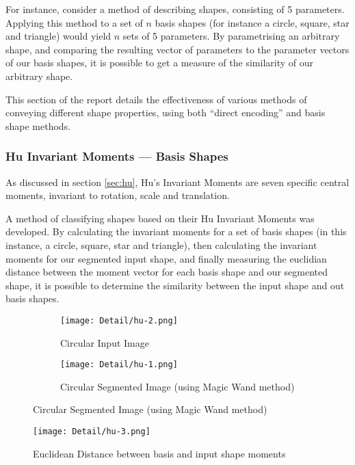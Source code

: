 For instance, consider a method of describing shapes, consisting of 5 parameters. Applying this method to a set of $n$ basis shapes (for instance a circle, square, star and triangle) would yield $n$ sets of 5 parameters. By parametrising an arbitrary shape, and comparing the resulting vector of parameters to the parameter vectors of our basis shapes, it is possible to get a measure of the similarity of our arbitrary shape.

This section of the report details the effectiveness of various methods of conveying different shape properties, using both ``direct encoding'' and basis shape methods.

\subsubsection{Hu Invariant Moments --- Basis Shapes}
\label{sec:hubs}
As discussed in section \ref{sec:hu}, Hu's Invariant Moments are seven specific central moments, invariant to rotation, scale and translation.

A method of classifying shapes based on their Hu Invariant Moments was developed. By calculating the invariant moments for a set of basis shapes (in this instance, a circle, square, star and triangle), then calculating the invariant moments for our segmented input shape, and finally measuring the euclidian distance between the moment vector for each basis shape and our segmented shape, it is possible to determine the similarity between the input shape and out basis shapes.



\begin{figure}[H]
    \centering
    \begin{subfigure}[h]{0.4\textwidth}
        \centering
        \texttt{[image: Detail/hu-2.png]}
        \caption{Circular Input Image}
    \end{subfigure}
    \begin{subfigure}[h]{0.4\textwidth}
        \centering
        \texttt{[image: Detail/hu-1.png]}
        \caption{Circular Segmented Image (using Magic Wand method)}
    \end{subfigure}
\end{figure}

\begin{figure}[H]
    \centering
    \texttt{[image: Detail/hu-3.png]}
    \caption{Euclidean Distance between basis and input shape moments}
\end{figure}

